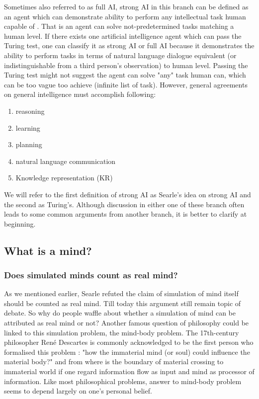 \documentclass[11pt]{article}
\newcommand{\dr}[1]{{\color{dark-cornflower-blue-2} #1}}
\newenvironment{draft}{\color{dark-cornflower-blue-2}}{\ignorespacesafterend}
\begin{document}
\begin{draft}
Sometimes also referred to as full AI, strong AI in this branch can be defined as an agent which can demonstrate ability to perform any intellectual task human capable of \cite{kurzweil2005singularity}. That is an agent can solve not-predetermined tasks matching a human level. If there exists one artificial intelligence agent which can pass the Turing test, one can classify it as strong AI or full AI because it demonstrates the ability to perform tasks in terms of natural language dialogue equivalent (or indistinguishable from a third person's observation) to human level. Passing the Turing test might not suggest the agent can solve "any" task human can, which can be too vague too achieve (infinite list of task). However, general agreements on general intelligence must accomplish following:
\begin{enumerate}
\item reasoning
\item learning
\item planning
\item natural language communication
\item Knowledge representation (KR) 
\end{enumerate}

We will refer to the first definition of strong AI as Searle's idea on strong AI and the second as Turing's. Although discussion in either one of these branch often leads to some common arguments from another branch, it is better to clarify at beginning. 
\end{draft}

\subsection{What is a mind?}
\label{sec:what_is_a_mind}

\subsubsection*{Does simulated minds count as real mind?}

\dr{
As we mentioned earlier, Searle refuted the claim of simulation of mind itself should be counted as real mind. Till today this argument still remain topic of debate. So why do people waffle about whether a simulation of mind can be attributed as real mind or not? Another famous question of philosophy could be linked to this simulation problem, the mind-body problem. The 17th-century philosopher Ren{\'e} Descartes is commonly acknowledged to be the first person who formalised this problem \cite{descartes1641meditationes}: "how the immaterial mind (or soul) could influence the material body?" and from where is the boundary of material crossing to immaterial world if one regard information flow as input and mind as processor of information. Like most philosophical problems, answer to mind-body problem seems to depend largely on one's personal belief.
}
\end{document}
